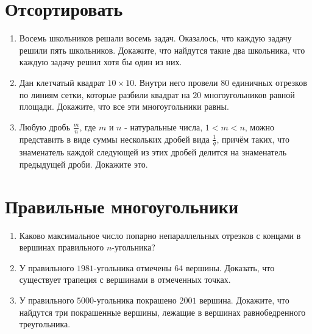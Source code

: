 \documentclass[fleqn,oneside]{book}
\begin{document}
\chapter*{Отсортировать}
\begin{enumerate}
\item Восемь школьников решали восемь задач. Оказалось, что каждую задачу решили пять школьников. Докажите, что найдутся такие два школьника, что каждую задачу решил хотя бы один из них. 


\item Дан клетчатый квадрат $10 \times 10$. Внутри него провели $80$ единичных отрезков по линиям сетки, которые разбили квадрат на $20$ многоугольников равной площади. Докажите, что все эти многоугольники равны.

\item Любую дробь $\frac{m}{n}$, где $m$ и $n$ - натуральные числа, $1 < m < n$, можно представить в виде суммы нескольких дробей вида $\frac{1}{q}$, причём таких, что знаменатель каждой следующей из этих дробей делится на знаменатель предыдущей дроби. Докажите это.
\end{enumerate}

\chapter*{Правильные многоугольники}

\begin{enumerate}
\item Каково максимальное число попарно непараллельных отрезков с концами в вершинах правильного $n$-угольника? 

\item У правильного $1981$-угольника отмечены $64$ вершины. Доказать, что существует трапеция с вершинами в отмеченных точках.

\item У правильного $5000$-угольника покрашено $2001$ вершина. Докажите, что найдутся три покрашенные вершины, лежащие в вершинах равнобедренного треугольника. 
\end{enumerate}
\end{document}
